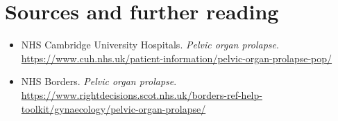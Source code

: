 \section*{Sources and further reading}
\begin{itemize}
\item NHS Cambridge University Hospitals. \textit{Pelvic organ prolapse}. \url{https://www.cuh.nhs.uk/patient-information/pelvic-organ-prolapse-pop/}
\item NHS Borders. \textit{Pelvic organ prolapse}. \url{https://www.rightdecisions.scot.nhs.uk/borders-ref-help-toolkit/gynaecology/pelvic-organ-prolapse/}
\end{itemize}
